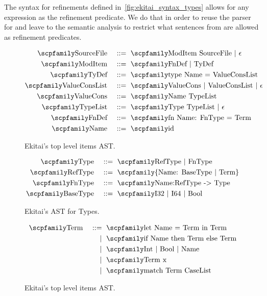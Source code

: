\documentclass[
  oneside,
  english,
  coorientadorbanca,
  noabntexcite
]{ufsc-thesis-rn46-2019}
\def\bnfdef{::=}
\newcommand{\codett}[1]{\text{\scpfamily#1}}
\newcommand{\code}[1]{\text{\scpfamily\setlength\spaceskip{0.35em}#1}}
\newcommand{\bnfvar}[1]{\codett{#1}}
\newcommand{\bnfor}[1]{{$\mid$} #1}
\newcommand{\bnfmore}[1]{            & \ & \mid{}    & \ \code{#1}}
\newcommand{\astprod}[2]{\code{#1} & \ & \bnfdef{} & \ \code{#2}}
\newcommand{\astmore}[1]{\bnfmore{#1}}
\begin{document}
The syntax for refinements defined in~\cref{fig:ekitai_syntax_types} allows for any expression as the refinement predicate.
We do that in order to reuse the parser for \bnfvar{Expr} and leave to the semantic analysis to restrict what sentences from \bnfvar{Expr} are allowed as refinement predicates.

\begin{figure}[!htb]
  \begin{alignat*}{2}
    \astprod{SourceFile}{ModItem SourceFile \bnfor{$\epsilon$}}           \\
    \astprod{ModItem}{FnDef \bnfor{TyDef}}                                \\
    \astprod{TyDef}{type Name = ValueConsList}                            \\
    \astprod{ValueConsList}{ValueCons | ValueConsList \bnfor{$\epsilon$}} \\
    \astprod{ValueCons}{Name TypeList}                                    \\
    \astprod{TypeList}{Type TypeList \bnfor{$\epsilon$}}                  \\
    \astprod{FnDef}{fn Name: FnType = Term}                               \\
    \astprod{Name}{id}
  \end{alignat*}
  \caption{Ekitai's top level items AST.}
\end{figure}

\begin{figure}[!htb]
  \begin{alignat*}{2}
    \astprod{Type}{RefType \bnfor{FnType}}       \\
    \astprod{RefType}{\{Name: BaseType | Term\}} \\
    \astprod{FnType}{Name:RefType -> Type}       \\
    \astprod{BaseType}{I32 \bnfor{I64} \bnfor{Bool}}
  \end{alignat*}
  \caption{Ekitai's AST for Types.}
\end{figure}

\begin{figure}[!htb]
  \begin{alignat*}{2}
    \astprod{Term}{let Name = Term in Term} \\
    \astmore{if Name then Term else Term}   \\
    \astmore{Int \bnfor{Bool} \bnfor{Name}} \\
    \astmore{Term x}                        \\
    \astmore{match Term CaseList}
  \end{alignat*}
  \caption{Ekitai's top level items AST.}
\end{figure}
\end{document}
